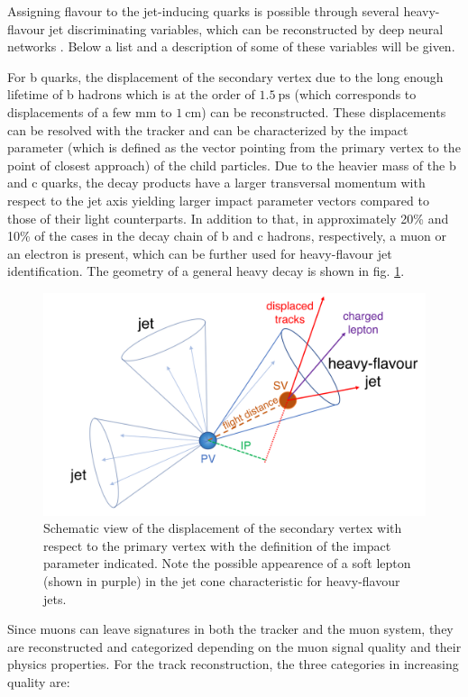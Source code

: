 
Assigning flavour to the jet-inducing quarks is possible through several heavy-flavour jet discriminating variables, which can be reconstructed by deep neural networks \cite{Sirunyan_2018}. Below a list and a description of some of these variables will be given.

For b quarks, the displacement of the secondary vertex due to the long enough lifetime of b hadrons which is at the order of $\SI{1.5}{\pico\second}$ (which corresponds to displacements of a few mm to $\SI{1}{\centi\meter}$) can be reconstructed. These displacements can be resolved with the tracker and can be characterized by the impact parameter (which is defined as the vector pointing from the primary vertex to the point of closest approach) of the child particles. Due to the heavier mass of the b and c quarks, the decay products have a larger transversal momentum with respect to the jet axis yielding larger impact parameter vectors compared to those of their light counterparts. In addition to that, in approximately 20\% and 10\% of the cases in the decay chain of b and c hadrons, respectively, a muon or an electron is present, which can be further used for heavy-flavour jet identification. The geometry of a general heavy decay is shown in fig. \ref{fig:pvsv}.

\begin{figure}[h!]
	\centering
	\includegraphics[width=0.6\linewidth]{figures/experiment/pvsv}
	\caption{Schematic view of the displacement of the secondary vertex with respect to the primary vertex with the definition of the impact parameter indicated. Note the possible appearence of a soft lepton (shown in purple) in the jet cone characteristic for heavy-flavour jets.}
	\label{fig:pvsv}
\end{figure}


Since muons can leave signatures in both the tracker and the muon system, they are reconstructed and categorized depending on the muon signal quality and their physics properties. For the track reconstruction, the three categories in increasing quality are: \cite{Collaboration_2010}

